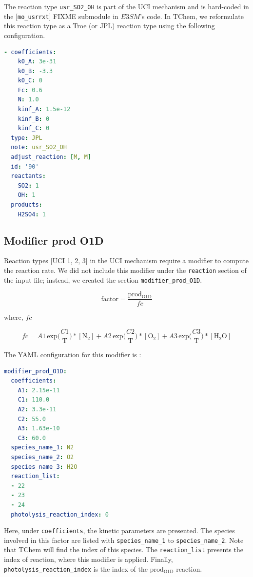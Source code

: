 \documentclass[report, 12pt]{SANDreport}
\newcommand{\eee}{E3SM}
\begin{document}
The reaction type \verb|usr_SO2_OH| is part of the UCI mechanism and is hard-coded in the [\verb|mo_usrrxt|]
FIXME%
submodule in $\eee$'s code. In TChem, we reformulate this reaction type as a Troe (or JPL) reaction type using the following configuration.

\begin{lstlisting}[language=yaml]
- coefficients:
    k0_A: 3e-31
    k0_B: -3.3
    k0_C: 0
    Fc: 0.6
    N: 1.0
    kinf_A: 1.5e-12
    kinf_B: 0
    kinf_C: 0
  type: JPL
  note: usr_SO2_OH
  adjust_reaction: [M, M]
  id: '90'
  reactants:
    SO2: 1
    OH: 1
  products:
    H2SO4: 1
\end{lstlisting}

\subsection{Modifier prod O1D}

Reaction types [UCI 1, 2, 3]
in the UCI mechanism require a modifier to compute the reaction rate. We did not include this modifier under the \verb|reaction| section of the input file; instead, we created the section \verb|modifier_prod_O1D|.

\begin{equation}
\mathrm{factor} = \frac{\mathrm{prod_{O1D}}}{fc}
\end{equation}

where, $fc$

\begin{equation}
fc = A1\, \mathrm{exp} \Big(\frac{C1}{\mathrm{T}} \Big) * [\mathrm{N_2}] +
A2\, \mathrm{exp} \Big(\frac{C2}{\mathrm{T}} \Big) * [\mathrm{O_2}] +
A3\, \mathrm{exp} \Big(\frac{C3}{\mathrm{T}} \Big) * [\mathrm{H_2O}]
\end{equation}

The YAML configuration for this modifier is :

\begin{lstlisting}[language=yaml]
modifier_prod_O1D:
  coefficients:
    A1: 2.15e-11
    C1: 110.0
    A2: 3.3e-11
    C2: 55.0
    A3: 1.63e-10
    C3: 60.0
  species_name_1: N2
  species_name_2: O2
  species_name_3: H2O
  reaction_list:
  - 22
  - 23
  - 24
  photolysis_reaction_index: 0
\end{lstlisting}
Here, under \verb|coefficients|, the kinetic parameters are presented. The species involved in this factor are listed with \verb|species_name_1| to \verb|species_name_2|. Note that TChem will find the index of this species. The \verb|reaction_list| presents the index of reaction, where this modifier is applied. Finally, \verb|photolysis_reaction_index| is the index of the $\mathrm{prod_{O1D}}$ reaction.
\end{document}
